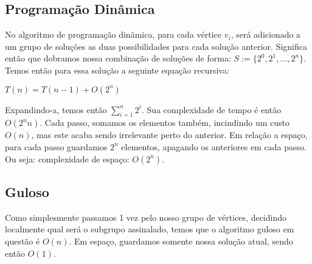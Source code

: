 \documentclass[a4paper,11pt,oneside]{article}
\begin{document}
    \subsection{Programa\c{c}\~{a}o Din\^amica}
    No algoritmo de programa\c{c}\~{a}o din\^amica, para cada v\'ertice \begin{math} v_i \end{math}, ser\'a adicionado a um grupo de solu\c{c}\~{o}es as duas possibilidades para cada solu\c{c}\~{a}o anterior. Significa ent\~{a}o que dobramos nossa combina\c{c}\~{a}o de solu\c{c}\~{o}es de forma: \begin{math} S := \{ 2^0, 2^1, ..., 2^n \}  \end{math}. Temos ent\~{a}o para essa solu\c{c}\~{a}o a seguinte equa\c{c}\~{a}o recursiva: 
    
    \begin{center}
      \begin{math} T(n) = T(n-1) + O(2^n) \end{math}
    \end{center}
    
    Expandindo-a, temos ent\~{a}o \begin{math} \sum_{i = 1}^{n} 2^i \end{math}. Sua complexidade de tempo \'e ent\~{a}o \begin{math} O(2^nn) \end{math}. Cada passo, somamos os elementos tamb\'em, incindindo um custo \begin{math} O(n) \end{math}, mas este acaba sendo irrelevante perto do anterior. Em rela\c{c}\~{a}o a espa\c{c}o, para cada passo guardamos \begin{math} 2^n \end{math} elementos, apagando os anteriores em cada passo. Ou seja: complexidade de espa\c{c}o: \begin{math} O(2^n) \end{math}.

    \subsection{Guloso}
    Como simplesmente passamos 1 vez pelo nosso grupo de v\'ertices, decidindo localmente qual ser\'a o subgrupo assinalado, temos que o algoritmo guloso em quest\~{a}o \'e \begin{math} O(n) \end{math}. Em espa\c{c}o, guardamos somente nossa solu\c{c}\~{a}o atual, sendo ent\~{a}o \begin{math} O(1) \end{math}.
\end{document}

